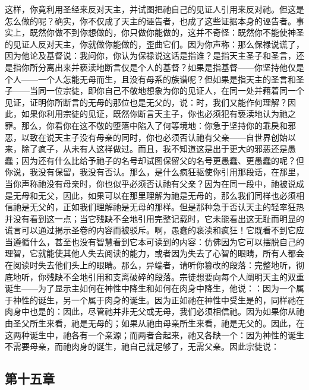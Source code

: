 这样，你竟利用圣经来反对天主，并试图把祂自己的见证人引用来反对祂。但这是怎么做的呢？确实，你不仅成了天主的诬告者，也成了这些证据本身的诬告者。事实上，既然你做不到你想做的，你只做你能做的，这并不奇怪：既然你不能使神圣的见证人反对天主，你就做你能做的，歪曲它们。因为你声称：那么保禄说谎了，因为他论及基督说：我问你，你认为保禄说这话是指谁？是指天主圣子和圣言，还是指你所分离出来并亵渎地断言仅是个人的基督？如果是指基督——你坚持他仅是个人——一个人怎能无母而生，且没有母系的族谱呢？但如果是指天主的圣言和圣子——当同一位宗徒，即你自己不敬地想象为你的见证人，在同一处并藉着同一个见证，证明你所断言的无母的那位也是无父的，说：时，我们又能作何理解？因此，如果你利用宗徒的见证，既然你断言天主子，你也必须犯有亵渎地认为祂之罪。那么，你看你在这不敬的堕落中陷入了何等境地：你急于坚持你的乖戾和邪恶，以致在说天主子没有母亲的同时，你也必须否认祂有父亲——自世界创始以来，除了疯子，从未有人这样做过。而且，我不知道这是出于更大的邪恶还是愚蠢；因为还有什么比给予祂子的名号却试图保留父的名号更愚蠢、更愚蠢的呢？但你说，我没有保留，我没有否认。那么，是什么疯狂驱使你引用那段话，在那里，当你声称祂没有母亲时，你也似乎必须否认祂有父亲？因为在同一段中，祂被说成是无母和无父，因此，如果可以在那里理解为祂是无母的，那么我们同样也必须相信祂是无父的，正如我们理解祂是无母的那样。但是那种急于否认天主的轻率狂热并没有看到这一点；当它残缺不全地引用完整记载时，它未能看出这无耻而明显的谎言可以通过揭示圣卷的内容而被驳斥。啊，愚蠢的亵渎和疯狂！它既看不到它应当遵循什么，甚至也没有智慧看到它本可读到的内容：仿佛因为它可以摆脱自己的理智，它就能使其他人失去阅读的能力，或者因为失去了心智的眼睛，所有人都会在阅读时失去他们头上的眼睛。那么，异端者，请听你篡改的段落：完整地听，彻底地听，你残缺不全地引用和支离破碎的段落。宗徒想要向每个人阐明天主的双重诞生——为了显示主如何在神性中降生和如何在肉身中降生，他说：：因为一个属于神性的诞生，另一个属于肉身的诞生。因为正如祂在神性中受生是的，同样祂在肉身中也是的：因此，尽管祂并非无父或无母，我们必须相信祂。因为如果你从祂由圣父所生来看，祂是无母的；如果从祂由母亲所生来看，祂是无父的。因此，在这两种诞生中，祂各有一个亲源；而两者合起来，祂又各缺一个：因为神性的诞生不需要母亲，而祂肉身的诞生，祂自己就足够了，无需父亲。因此宗徒说：\par


\subsection{第十五章}

